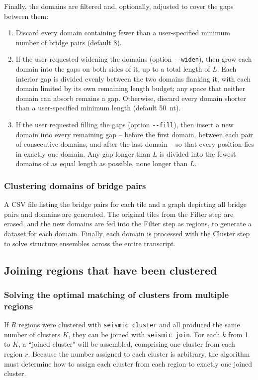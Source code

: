 \documentclass{article}
\begin{document}
Finally, the domains are filtered and, optionally, adjusted to cover the gaps between them:
\begin{enumerate}
    \item Discard every domain containing fewer than a user-specified minimum number of bridge pairs (default 8).
    \item If the user requested widening the domains (option \verb|--widen|), then grow each domain into the gaps on both sides of it, up to a total length of $L$.
    Each interior gap is divided evenly between the two domains flanking it, with each domain limited by its own remaining length budget; any space that neither domain can absorb remains a gap.
    Otherwise, discard every domain shorter than a user-specified minimum length (default 50~nt).
    \item If the user requested filling the gaps (option \verb|--fill|), then insert a new domain into every remaining gap -- before the first domain, between each pair of consecutive domains, and after the last domain -- so that every position lies in exactly one domain.
    Any gap longer than $L$ is divided into the fewest domains of as equal length as possible, none longer than $L$.
\end{enumerate}


\subsubsection{Clustering domains of bridge pairs}

A CSV file listing the bridge pairs for each tile and a graph depicting all bridge pairs and domains are generated.
The original tiles from the Filter step are erased, and the new domains are fed into the Filter step as regions, to generate a dataset for each domain.
Finally, each domain is processed with the Cluster step to solve structure ensembles across the entire transcript.


\subsection{Joining regions that have been clustered}

\subsubsection{Solving the optimal matching of clusters from multiple regions}

If $R$ regions were clustered with \verb|seismic cluster| and all produced the same number of clusters $K$, they can be joined with \verb|seismic join|.
For each $k$ from 1 to $K$, a ``joined cluster" will be assembled, comprising one cluster from each region $r$.
Because the number assigned to each cluster is arbitrary, the algorithm must determine how to assign each cluster from each region to exactly one joined cluster.
\end{document}
